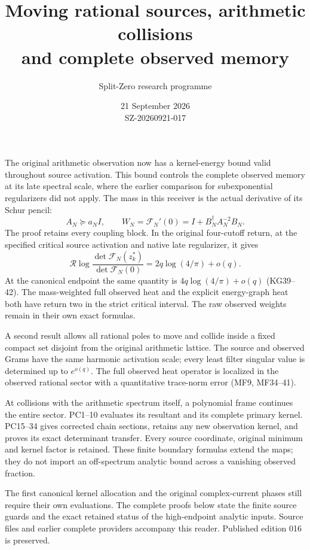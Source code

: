\documentclass[11pt]{article}
\title{Moving rational sources, arithmetic collisions\\and complete observed memory}
\author{Split-Zero research programme}
\date{21 September 2026\\SZ-20260921-017}
\begin{document}
\maketitle
The original arithmetic observation now has a kernel-energy bound valid
throughout source activation. This bound controls the complete observed
memory at its late spectral scale, where the earlier comparison for
subexponential regularizers did not apply. The mass in this receiver is
the actual derivative of its Schur pencil:
\[
A_N\succeq a_NI,\qquad
W_N=\mathcal F_N'(0)=I+B_N^\dagger A_N^{-2}B_N.
\]
The proof retains every coupling block. In the original four-cutoff
return, at the specified critical source activation and native late
regularizer, it gives
\[
\mathcal R\log\frac{\det\mathcal F_N(z_k^*)}{\det\mathcal F_N(0)}
=2q\log(4/\pi)+o(q).
\]
At the canonical endpoint the same quantity is
$4q\log(4/\pi)+o(q)$ (KG39--42). The mass-weighted full observed
heat and the explicit energy-graph heat both have return two in the
strict critical interval. The raw observed weights remain in their
own exact formulas.

A second result allows all rational poles to move and collide inside
a fixed compact set disjoint from the original arithmetic lattice.
The source and observed Grams have the same harmonic activation scale;
every least filter singular value is determined up to $e^{o(q)}$.
The full observed heat operator is localized in the observed rational
sector with a quantitative trace-norm error (MF9, MF34--41).

At collisions with the arithmetic spectrum itself, a polynomial frame
continues the entire sector. PC1--10 evaluates its resultant and its
complete primary kernel. PC15--34 gives corrected chain sections,
retains any new observation kernel, and proves its exact determinant
transfer. Every source coordinate, original minimum and kernel factor
is retained. These finite boundary formulas extend the maps; they do
not import an off-spectrum analytic bound across a vanishing observed
fraction.

The first canonical kernel allocation and the original complex-current
phases still require their own evaluations. The complete proofs below
state the finite source guards and the exact retained status of the
high-endpoint analytic inputs. Source files and earlier complete
providers accompany this reader. Published edition 016 is preserved.
\begingroup\small\tableofcontents\endgroup\clearpage
\end{document}
